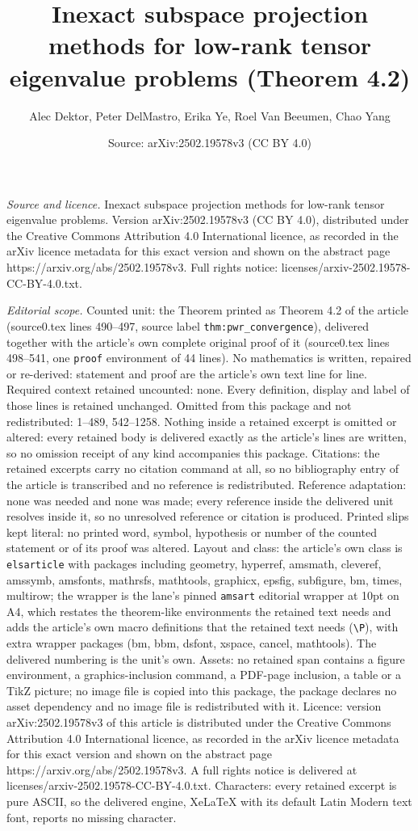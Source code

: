 \documentclass[10pt,a4paper]{amsart}
\title[Inexact subspace projection methods for low-rank tensor eige]{Inexact subspace projection methods for low-rank tensor eigenvalue problems (Theorem 4.2)}
\author{Alec Dektor, Peter DelMastro, Erika Ye, Roel Van Beeumen, Chao Yang}
\date{Source: arXiv:2502.19578v3 (CC BY 4.0)}
\begin{document}
\maketitle

\noindent\emph{Source and licence.} Inexact subspace projection methods for low-rank tensor eigenvalue problems. Version arXiv:2502.19578v3 (CC BY 4.0), distributed under the Creative Commons Attribution 4.0 International licence, as recorded in the arXiv licence metadata for this exact version and shown on the abstract page https://arxiv.org/abs/2502.19578v3. Full rights notice: licenses/arxiv-2502.19578-CC-BY-4.0.txt.\par\smallskip

\noindent\textit{Editorial scope.} Counted unit: the Theorem printed as Theorem 4.2 of the article (source0.tex lines 490--497, source label \texttt{thm:pwr\_convergence}), delivered together with the article's own complete original proof of it (source0.tex lines 498--541, one \texttt{proof} environment of 44 lines). No mathematics is written, repaired or re-derived: statement and proof are the article's own text line for line. Required context retained uncounted: none. Every definition, display and label of those lines is retained unchanged. Omitted from this package and not redistributed: 1--489, 542--1258. Nothing inside a retained excerpt is omitted or altered: every retained body is delivered exactly as the article's lines are written, so no omission receipt of any kind accompanies this package. Citations: the retained excerpts carry no citation command at all, so no bibliography entry of the article is transcribed and no reference is redistributed. Reference adaptation: none was needed and none was made; every reference inside the delivered unit resolves inside it, so no unresolved reference or citation is produced. Printed slips kept literal: no printed word, symbol, hypothesis or number of the counted statement or of its proof was altered. Layout and class: the article's own class is \texttt{elsarticle} with packages including geometry, hyperref, amsmath, cleveref, amssymb, amsfonts, mathrsfs, mathtools, graphicx, epsfig, subfigure, bm, times, multirow; the wrapper is the lane's pinned \texttt{amsart} editorial wrapper at 10pt on A4, which restates the theorem-like environments the retained text needs and adds the article's own macro definitions that the retained text needs (\texttt{\textbackslash P}), with extra wrapper packages (bm, bbm, dsfont, xspace, cancel, mathtools). The delivered numbering is the unit's own. Assets: no retained span contains a figure environment, a graphics-inclusion command, a PDF-page inclusion, a table or a TikZ picture; no image file is copied into this package, the package declares no asset dependency and no image file is redistributed with it. Licence: version arXiv:2502.19578v3 of this article is distributed under the Creative Commons Attribution 4.0 International licence, as recorded in the arXiv licence metadata for this exact version and shown on the abstract page https://arxiv.org/abs/2502.19578v3. A full rights notice is delivered at licenses/arxiv-2502.19578-CC-BY-4.0.txt. Characters: every retained excerpt is pure ASCII, so the delivered engine, XeLaTeX with its default Latin Modern text font, reports no missing character.
\end{document}

